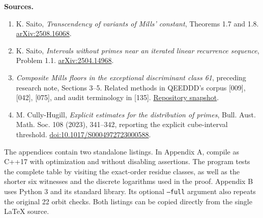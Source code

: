 \documentclass[11pt,a4paper,oneside,openany]{book}
\begin{document}
\textbf{Sources.}
\begin{enumerate}\raggedright
\item K. Saito, \emph{Transcendency of variants of Mills' constant}, Theorems 1.7 and 1.8. \href{https://arxiv.org/abs/2508.16068}{arXiv:2508.16068}.
\item K. Saito, \emph{Intervals without primes near an iterated linear recurrence sequence}, Problem 1.1. \href{https://arxiv.org/abs/2504.14968}{arXiv:2504.14968}.
\item \emph{Composite Mills floors in the exceptional discriminant class 61}, preceding research note, Sections 3--5. Related methods in QEEDDD's corpus [009], [042], [075], and audit terminology in [135]. \href{https://github.com/QEEDDD/Verifiable-Mathematical-Reasoning-Corpus/tree/38348353416f1f7fc50cecb93c3b554a00260c13}{Repository snapshot}.
\item M. Cully-Hugill, \emph{Explicit estimates for the distribution of primes}, Bull. Aust. Math. Soc. 108 (2023), 341--342, reporting the explicit cube-interval threshold. \href{https://doi.org/10.1017/S0004972723000588}{doi:10.1017/S0004972723000588}.
\end{enumerate}

The appendices contain two standalone listings. In Appendix A, compile as C++17 with optimization and without disabling assertions. The program tests the complete table by visiting the exact-order residue classes, as well as the shorter six witnesses and the discrete logarithms used in the proof. Appendix B uses Python 3 and its standard library. Its optional \texttt{--full} argument also repeats the original 22 orbit checks. Both listings can be copied directly from the single \LaTeX{} source.
\end{document}
